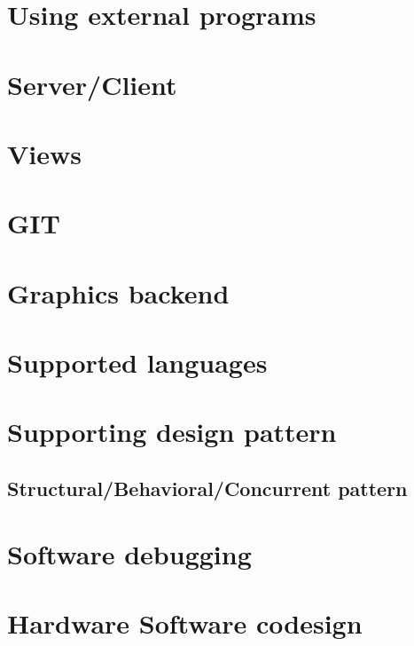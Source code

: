 
\section{Using external programs}


\section{Server/Client}


\section{Views}


\section{GIT}


\section{Graphics backend}


\section{Supported languages}


\section{Supporting design pattern}


\subsection{Structural/Behavioral/Concurrent pattern}

\section{Software debugging}


\section{Hardware Software codesign}


